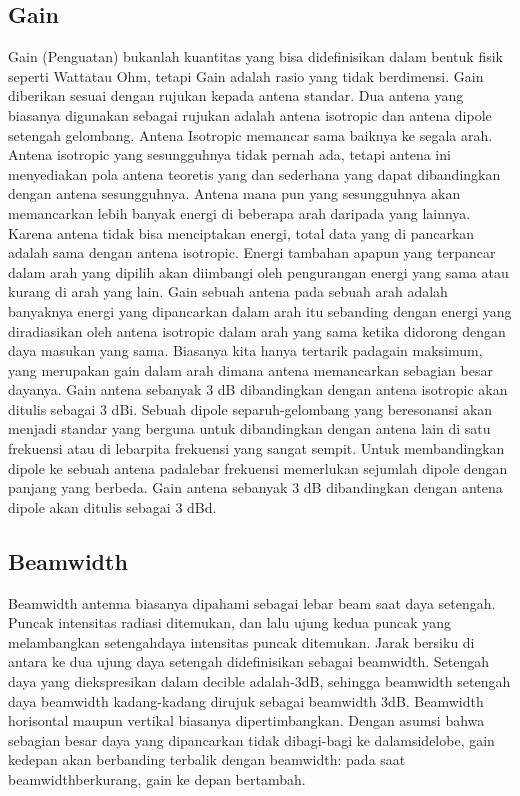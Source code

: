 \documentclass[a4paper,12pt]{article}
\begin{document}
\subsection{Gain}
Gain (Penguatan) bukanlah kuantitas yang bisa didefinisikan dalam bentuk fisik seperti Wattatau Ohm, tetapi Gain adalah rasio yang tidak berdimensi. Gain
diberikan sesuai dengan rujukan kepada antena standar. Dua antena yang biasanya digunakan sebagai rujukan adalah antena isotropic dan antena dipole
setengah gelombang. Antena Isotropic memancar sama baiknya ke segala arah. Antena isotropic yang sesungguhnya tidak pernah ada, tetapi antena ini menyediakan 
pola antena teoretis yang dan sederhana yang dapat dibandingkan dengan antena sesungguhnya. Antena mana pun yang sesungguhnya akan memancarkan lebih banyak energi
di beberapa arah daripada yang lainnya. Karena antena tidak bisa menciptakan energi, total data yang di pancarkan adalah sama dengan antena isotropic. Energi
tambahan apapun yang terpancar dalam arah yang dipilih akan diimbangi oleh pengurangan energi yang sama atau kurang di arah yang lain. Gain sebuah antena pada
sebuah arah adalah banyaknya energi yang dipancarkan dalam arah itu sebanding dengan energi yang diradiasikan oleh antena isotropic dalam arah yang sama ketika 
didorong dengan daya masukan yang sama. Biasanya kita hanya tertarik padagain maksimum, yang merupakan gain dalam arah dimana antena memancarkan sebagian besar
dayanya. Gain antena sebanyak 3 dB dibandingkan dengan antena isotropic akan ditulis sebagai 3 dBi.  Sebuah dipole separuh-gelombang yang beresonansi akan
menjadi standar yang berguna untuk dibandingkan dengan antena lain di satu frekuensi atau di lebarpita frekuensi yang sangat sempit. Untuk membandingkan dipole ke
sebuah antena padalebar frekuensi memerlukan sejumlah dipole dengan panjang yang berbeda. Gain antena sebanyak 3 dB dibandingkan dengan antena dipole akan ditulis
sebagai 3 dBd.

\subsection{Beamwidth}
Beamwidth  antenna biasanya dipahami sebagai lebar beam saat daya setengah. Puncak intensitas radiasi ditemukan, dan
lalu ujung kedua puncak yang melambangkan setengahdaya intensitas puncak ditemukan. Jarak bersiku di antara ke dua ujung
daya setengah didefinisikan sebagai beamwidth. Setengah daya yang diekspresikan dalam decible adalah-3dB, sehingga
beamwidth setengah daya beamwidth kadang-kadang dirujuk sebagai beamwidth 3dB. Beamwidth horisontal maupun
vertikal biasanya dipertimbangkan. Dengan asumsi bahwa sebagian besar daya yang dipancarkan tidak dibagi-bagi ke
dalamsidelobe,  gain kedepan akan berbanding terbalik dengan beamwidth: pada saat beamwidthberkurang, gain ke depan
bertambah.
\end{document}
